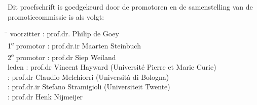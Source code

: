     \newpage %
    \thispagestyle{empty}
    \noindent Dit proefschrift is goedgekeurd door de promotoren en de samenstelling van de 
    promotiecommissie is als volgt:
    \bigskip{}
    \noindent
    \begin{flushleft}
    \begin{tabbing}
    \hspace*{20mm}\=\hspace{1em}\=\hspace{15mm}\=\hspace{35mm}\=\kill
    voorzitter                     \> : \> prof.dr.   \> Philip de Goey                                           \\
    1\textsuperscript{e} promotor  \> : \> prof.dr.ir \> Maarten Steinbuch                                        \\
    2\textsuperscript{e} promotor  \> : \> prof.dr	  \>  Siep Weiland                                            \\
    leden                          \> : \> prof.dr    \> Vincent Hayward    \> (Université Pierre et Marie Curie) \\
                                   \> : \> prof.dr    \> Claudio Melchiorri \> (Università di Bologna)            \\
                                   \> : \> prof.dr.ir \> Stefano Stramigioli\> (Universiteit Twente)              \\
                                   \> : \> prof.dr    \> Henk Nijmeijer                                           \\
    \end{tabbing}
    \end{flushleft}
\newpage
\thispagestyle{empty}
\begin{center}
    \textbf{\huge \ilhant}
\end{center}

